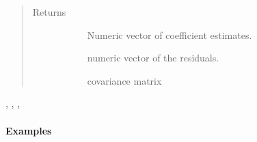 \documentclass[letterpaper,10pt,english]{sphinxmanual}
\begin{document}
\begin{fulllineitems}
\begin{quote}
\begin{description}
\begin{description}
\end{description}

\item[{Returns}] \leavevmode\begin{description}
\item[{}] \leavevmode
Numeric vector of coefficient estimates.

\item[{}] \leavevmode
numeric vector of the residuals.

\item[{}] \leavevmode
covariance matrix

\end{description}

\end{description}\end{quote}




{\hyperref[\detokenize{_modules/nlrob:module-nlrob}]{}}, {\hyperref[\detokenize{_modules/nlrob:nlrob.nlrob_MM}]{}}, {\hyperref[\detokenize{_modules/nlrob:nlrob.nlrob_tau}]{}}, 


\paragraph{Examples}


\end{fulllineitems}
\end{document}
